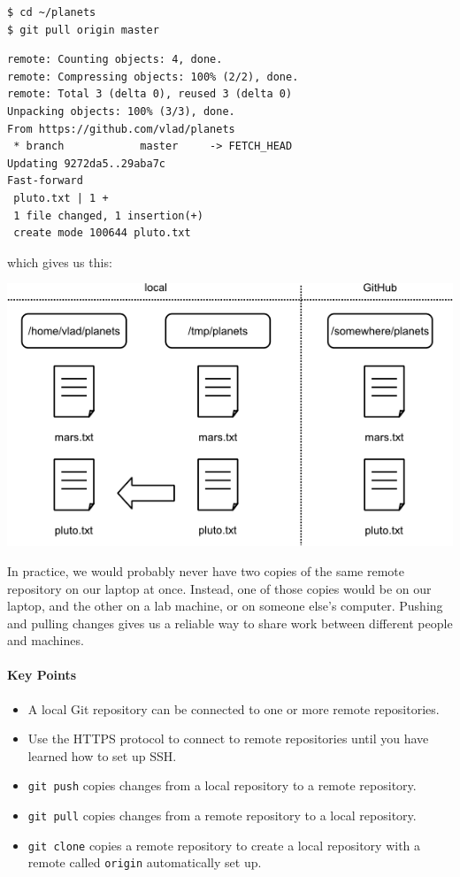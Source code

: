 \documentclass[]{book}
\begin{document}
\begin{verbatim}
$ cd ~/planets
$ git pull origin master
\end{verbatim}

\begin{verbatim}
remote: Counting objects: 4, done.
remote: Compressing objects: 100% (2/2), done.
remote: Total 3 (delta 0), reused 3 (delta 0)
Unpacking objects: 100% (3/3), done.
From https://github.com/vlad/planets
 * branch            master     -> FETCH_HEAD
Updating 9272da5..29aba7c
Fast-forward
 pluto.txt | 1 +
 1 file changed, 1 insertion(+)
 create mode 100644 pluto.txt
\end{verbatim}

which gives us this:

\includegraphics{novice/git/img/git-after-pulling-to-local-repo.png}

In practice, we would probably never have two copies of the same remote
repository on our laptop at once. Instead, one of those copies would be
on our laptop, and the other on a lab machine, or on someone else's
computer. Pushing and pulling changes gives us a reliable way to share
work between different people and machines.

\mbox{}\paragraph{Key Points}

\begin{itemize}
\item
  A local Git repository can be connected to one or more remote
  repositories.
\item
  Use the HTTPS protocol to connect to remote repositories until you
  have learned how to set up SSH.
\item
  \texttt{git push} copies changes from a local repository to a remote
  repository.
\item
  \texttt{git pull} copies changes from a remote repository to a local
  repository.
\item
  \texttt{git clone} copies a remote repository to create a local
  repository with a remote called \texttt{origin} automatically set up.
\end{itemize}
\end{document}
